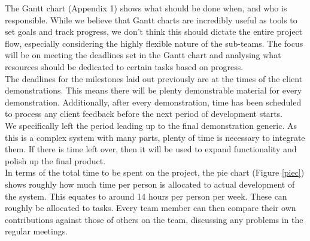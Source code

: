 \documentclass[a4paper,10pt,DIV10,openright,openbib]{scrreprt}
\begin{document}
The Gantt chart (Appendix 1) shows what should be done when, and who is responsible.
While we believe that Gantt charts are incredibly useful as tools to set goals and track
progress, we don't think this should dictate the entire project flow, especially considering
the highly flexible nature of the sub-teams. The focus will be on meeting the deadlines set
in the Gantt chart and analysing what resources should be dedicated to certain
tasks based on progress.\\
The deadlines for the milestones laid out previously are at the times of the client demonstrations.
This means there will be plenty demonstrable material for every demonstration. Additionally,
after every demonstration, time has been scheduled to process any client feedback before the
next period of development starts.\\
We specifically left the period leading up to the final demonstration generic.
As this is a complex system with many parts, plenty of time is necessary to integrate them.
If there is time left over, then it will be used to expand functionality and polish up the final product.\\
In terms of the total time to be spent on the project, the pie chart (Figure \ref{piec}) shows roughly how
much time per person is allocated to actual development of the system. This equates to around
14 hours per person per week. These can roughly be allocated to tasks. Every
team member
can then  compare their own contributions against those of others on the team, discussing any
problems in the regular meetings.
\end{document}
